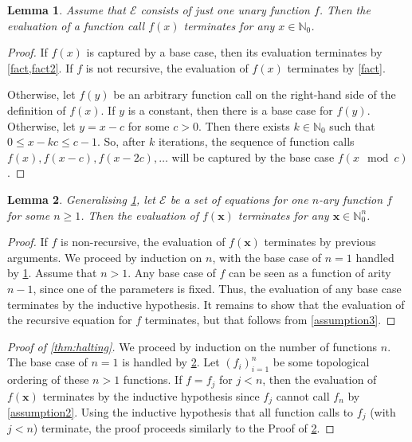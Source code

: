 \documentclass[letterpaper]{article} %
\newtheorem{lemma}{Lemma}
\theoremstyle{remark}
\theoremstyle{definition}
\begin{document}
\begin{lemma}\label{lemma:oneunary}
  Assume that $\mathcal{E}$ consists of just \emph{one unary} function $f$. Then
  the evaluation of a function call $f(x)$ terminates for any
  $x \in \mathbb{N}_{0}$.
\end{lemma}
\begin{proof}
  If $f(x)$ is captured by a base case, then its evaluation terminates by
  \cref{fact,fact2}. If $f$ is not recursive, the evaluation of
  $f(x)$ terminates by \cref{fact}.

  Otherwise, let $f(y)$ be an arbitrary function call on the right-hand side of
  the definition of $f(x)$. If $y$ is a constant, then there is a base case for
  $f(y)$. Otherwise, let $y = x - c$ for some $c > 0$. Then there exists
  $k \in \mathbb{N}_{0}$ such that $0 \le x - kc \le c-1$. So, after $k$
  iterations, the sequence of function calls $f(x), f(x-c), f(x-2c),\dots$ will
  be captured by the base case $f(x \mod c)$.
\end{proof}

\begin{lemma}\label{lemma:onefunction}
  Generalising \cref{lemma:oneunary}, let $\mathcal{E}$ be a set of equations
  for \emph{one} $n$-ary function $f$ for some $n \ge 1$. Then the evaluation of
  $f(\mathbf{x})$ terminates for any $\mathbf{x} \in \mathbb{N}_{0}^{n}$.
\end{lemma}
\begin{proof}
  If $f$ is non-recursive, the evaluation of $f(\mathbf{x})$ terminates by
  previous arguments. We proceed by induction on $n$, with the base case of
  $n=1$ handled by \cref{lemma:oneunary}. Assume that $n > 1$. Any base case of
  $f$ can be seen as a function of arity $n-1$, since one of the parameters is
  fixed. Thus, the evaluation of any base case terminates by the inductive
  hypothesis. It remains to show that the evaluation of the recursive equation
  for $f$ terminates, but that follows from \cref{assumption3}.
\end{proof}

\begin{proof}[Proof of \cref{thm:halting}]
  We proceed by induction on the number of functions $n$. The base case of $n=1$
  is handled by \cref{lemma:onefunction}. Let ${(f_{i})}_{i=1}^{n}$ be some
  topological ordering of these $n > 1$ functions. If $f = f_{j}$ for $j < n$,
  then the evaluation of $f(\mathbf{x})$ terminates by the inductive hypothesis
  since $f_{j}$ cannot call $f_{n}$ by \cref{assumption2}. Using the inductive
  hypothesis that all function calls to $f_{j}$ (with $j < n$) terminate, the
  proof proceeds similarly to the Proof of \cref{lemma:onefunction}.
\end{proof}
\end{document}
